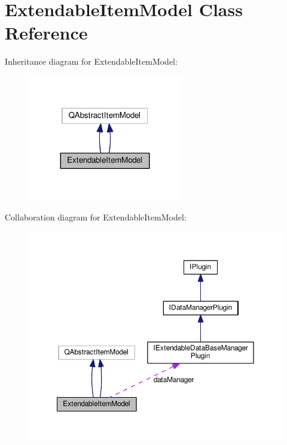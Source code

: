 \hypertarget{class_extendable_item_model}{}\section{Extendable\+Item\+Model Class Reference}
\label{class_extendable_item_model}


Inheritance diagram for Extendable\+Item\+Model\+:\nopagebreak
\begin{figure}[H]
\begin{center}
\leavevmode
\includegraphics[width=191pt]{class_extendable_item_model__inherit__graph}
\end{center}
\end{figure}


Collaboration diagram for Extendable\+Item\+Model\+:\nopagebreak
\begin{figure}[H]
\begin{center}
\leavevmode
\includegraphics[width=350pt]{class_extendable_item_model__coll__graph}
\end{center}
\end{figure}
